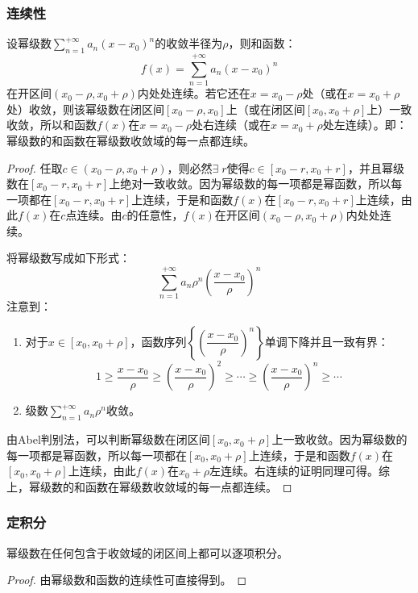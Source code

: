 \subsubsection{连续性}
\begin{theorem}
	设幂级数$\sum\limits_{n=1}^{+\infty}a_n(x-x_0)^n$的收敛半径为$\rho$，则和函数：
	\begin{equation*}
		f(x)=\sum_{n=1}^{+\infty}a_n(x-x_0)^n
	\end{equation*}
	在开区间$(x_0-\rho,x_0+\rho)$内处处连续。若它还在$x=x_0-\rho$处（或在$x=x_0+\rho$处）收敛，则该幂级数在闭区间$[x_0-\rho,x_0]$上（或在闭区间$[x_0,x_0+\rho]$上）一致收敛，所以和函数$f(x)$在$x=x_0-\rho$处右连续（或在$x=x_0+\rho$处左连续）。即：幂级数的和函数在幂级数收敛域的每一点都连续。
\end{theorem}
\begin{proof}
	任取$c\in(x_0-\rho,x_0+\rho)$，则必然$\exists\;r$使得$c\in[x_0-r,x_0+r]$，并且幂级数在$[x_0-r,x_0+r]$上绝对一致收敛。因为幂级数的每一项都是幂函数，所以每一项都在$[x_0-r,x_0+r]$上连续，于是和函数$f(x)$在$[x_0-r,x_0+r]$上连续，由此$f(x)$在$c$点连续。由$c$的任意性，$f(x)$在开区间$(x_0-\rho,x_0+\rho)$内处处连续。\par
	将幂级数写成如下形式：
	\begin{equation*}
		\sum_{n=1}^{+\infty}a_n\rho^n\left(\frac{x-x_0}{\rho}\right)^n
	\end{equation*}
	注意到：
	\begin{enumerate}
		\item 对于$x\in[x_0,x_0+\rho]$，函数序列$\left\{\left(\dfrac{x-x_0}{\rho}\right)^n\right\}$单调下降并且一致有界：
		\begin{equation*}
			1\geqslant\frac{x-x_0}{\rho}\geqslant\left(\frac{x-x_0}{\rho}\right)^2\geqslant\cdots\geqslant\left(\frac{x-x_0}{\rho}\right)^n\geqslant\cdots
		\end{equation*}
		\item 级数$\sum\limits_{n=1}^{+\infty}a_n\rho^n$收敛。
	\end{enumerate}
	由Abel判别法，可以判断幂级数在闭区间$[x_0,x_0+\rho]$上一致收敛。因为幂级数的每一项都是幂函数，所以每一项都在$[x_0,x_0+\rho]$上连续，于是和函数$f(x)$在$[x_0,x_0+\rho]$上连续，由此$f(x)$在$x_0+\rho$左连续。右连续的证明同理可得。综上，幂级数的和函数在幂级数收敛域的每一点都连续。
\end{proof}
\subsubsection{定积分}
\begin{theorem}
	幂级数在任何包含于收敛域的闭区间上都可以逐项积分。
\end{theorem}
\begin{proof}
	由幂级数和函数的连续性可直接得到。
\end{proof}

